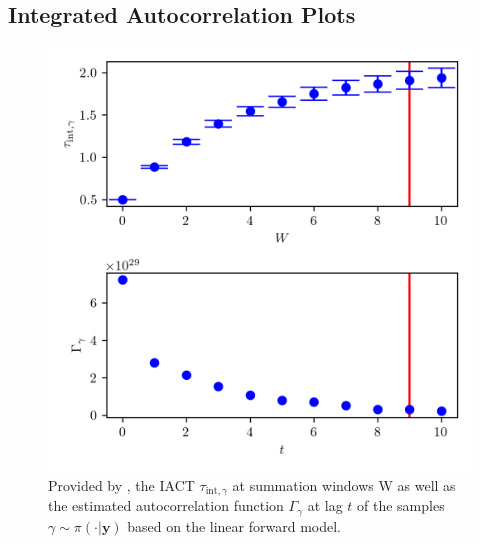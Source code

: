 \subsection{Integrated Autocorrelation Plots} 
\begin{figure}[ht!]
	\centering
	\includegraphics{UwerrTauIntFirstO3gam.png}
	\caption[IACT and autocorrelation of samples $\gamma \sim \pi( \cdot | \bm{y})$, for linear model.]{Provided by \cite{drikHesse}, the IACT $\tau_{\text{int},\gamma}$ at summation windows W as well as the estimated autocorrelation function $\Gamma_{\gamma}$ at lag $t$ of the samples $\gamma \sim \pi(\cdot| \bm{y})$ based on the linear forward model.}
	\label{fig:IATCGamLin}
\end{figure}
